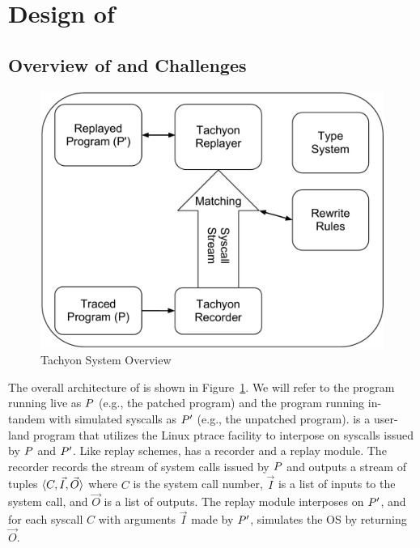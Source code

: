 \section{Design of \tachyon}



\subsection{Overview of \tachyon and Challenges}

\begin{figure}
  \centering
  \includegraphics[scale=0.5]{tachyon/TachyonDiagram.pdf}
  \caption{Tachyon System Overview}
  \label{tach:fig:system}
\end{figure}

The overall architecture of \tachyon is shown in
Figure~\ref{tach:fig:system}.
We will refer to the program running
live  as $P$ (e.g., the patched program) and the program running
in-tandem with simulated syscalls as $P'$ (e.g., the unpatched
program).  \tachyon is a user-land program that utilizes the Linux
ptrace facility to interpose on syscalls issued by $P$ and
$P'$.  Like replay schemes, \tachyon has a recorder and a
replay module. The recorder records the stream of system calls
issued by $P$ and outputs a stream of tuples
$\langle C, \vec{I}, \vec{O} \rangle$ where $C$ is the system call number,
$\vec{I}$ is a list of inputs to the system call, and $\vec{O}$ is a
list of outputs.  The replay module interposes on $P'$, and
for each syscall $C$ with arguments $\vec{I}$ made by $P'$,
simulates the OS by returning $\vec{O}$.

